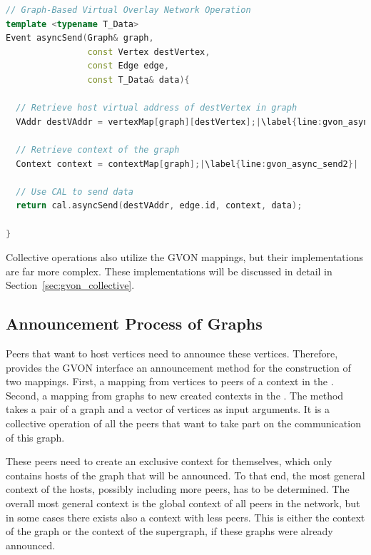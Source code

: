 \begin{lstlisting}[language=C++, label=lst:comm_gvon, caption={\ }, escapechar=| ]
// Graph-Based Virtual Overlay Network Operation  
template <typename T_Data>
Event asyncSend(Graph& graph, 
                const Vertex destVertex, 
                const Edge edge, 
                const T_Data& data){ 

  // Retrieve host virtual address of destVertex in graph
  VAddr destVAddr = vertexMap[graph][destVertex];|\label{line:gvon_async_send1}|

  // Retrieve context of the graph
  Context context = contextMap[graph];|\label{line:gvon_async_send2}|

  // Use CAL to send data
  return cal.asyncSend(destVAddr, edge.id, context, data);

}
\end{lstlisting}

\noindent Collective operations also utilize the GVON mappings, but their
implementations are far more complex. These implementations will be
discussed in detail in Section~\ref{sec:gvon_collective}.


\subsection{Announcement Process of Graphs}
\label{sec:announcement_impl}

Peers that want to host vertices need to announce these vertices.
Therefore, provides the GVON interface an announcement method for the
construction of two mappings. First, a mapping from vertices to peers
of a context in the . Second, a mapping from graphs to
new created contexts in the .  The method takes a pair
of a graph and a vector of vertices as input arguments.  It is a
collective operation of all the peers that want to take part on the
communication of this graph.

These peers need to create an exclusive context for
themselves, which only contains hosts of the graph that will be
announced.  To that end, the most general context of the hosts, possibly
including more peers, has to be determined.  The overall most general
context is the global context of all peers in the network, but in some
cases there exists also a context with less peers.  This is either the
context of the graph or the context of the supergraph, if these graphs
were already announced.

